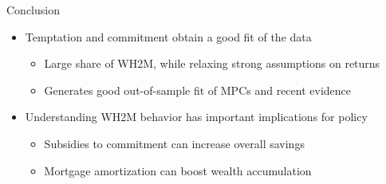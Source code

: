 \documentclass[10pt,english,t,10pt]{beamer}
\begin{document}
\begin{frame} {Conclusion}


\begin{itemize}

\item Temptation and commitment obtain a good fit of the data
\begin{itemize}
\medskip
\item Large share of WH2M, while relaxing strong assumptions on returns
\medskip
\item Generates good out-of-sample fit of MPCs and recent evidence 

\end{itemize}
%

\medskip \medskip \medskip
\pause
\item Understanding WH2M behavior has important implications for policy
\begin{itemize}
\medskip
\item Subsidies to commitment can increase overall savings
\medskip
\item Mortgage amortization can boost wealth accumulation
\end{itemize}

\end{itemize}

\end{frame}
\end{document}

